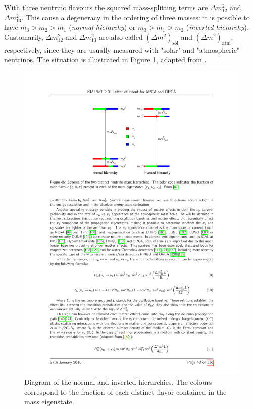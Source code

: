 With three neutrino flavours the squared mass-splitting terms are $\Delta m_{12}^2$ and $\Delta m_{13}^2$. This cause a degeneracy in the ordering of three masses: it is possible to have $m_3 > m_2 > m_1$ (\emph{normal hierarchy}) or $m_3 > m_1 > m_2$ (\emph{inverted hierarchy}). Customarily, $\Delta m_{12}^2$ and $\Delta m_{13}^2$ are also called $(\Delta m^2)_{\mathrm{sol}}$ and $(\Delta m^2)_{\mathrm{atm}}$, respectively, since they are usually measured with "solar" and "atmospheric" neutrinos. The situation is illustrated in Figure \ref{fig:masshierarchy}, adapted from \cite{Cahn:2013taa}.

\begin{figure}
    \centering
    \includegraphics[width=0.75\linewidth]{figures/masshierarchy.pdf}
    \caption{Diagram of the normal and inverted hierarchies. The colours correspond to the fraction of each distinct flavor contained in the mass eigenstate.}
    \label{fig:masshierarchy}
\end{figure}


